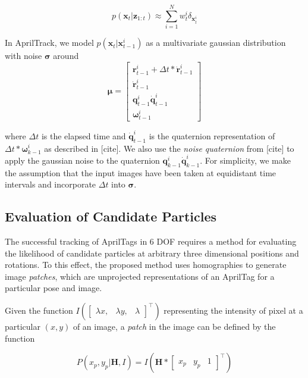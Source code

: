 \documentclass[letterpaper, 10 pt, conference]{ieeeconf}
\renewcommand{\vec}[1]{\boldsymbol{#1}}
\begin{document}
\begin{equation}
	p(\vec{x}_t|\vec{z}_{1:t}) \approx \sum_{i=1}^{N}{w^i_t\delta_{\vec{x}^i_t}}
\end{equation}

In AprilTrack, we model $p(\vec{x}_t|\vec{x}^i_{t-1})$ as a multivariate gaussian distribution with noise $\vec{\sigma}$ around 
\begin{equation}
\vec{\mu} = 
\begin{bmatrix} 
	\vec{r}^i_{t-1} + \Delta t * \dot{\vec{r}}^i_{t-1} \\
 	\dot{\vec{r}}^i_{t-1} \\
	\vec{q}^i_{t-1} \dot{\vec{q}}^i_{t-1}\\
	\vec{\omega}^i_{t-1}
\end{bmatrix}
\end{equation}

where $\Delta t$ is the elapsed time and $\dot{\vec{q}}^i_{t-1}$ is the quaternion representation of $\Delta t * \vec{\omega}^i_{k-1}$ as described in [cite]. We also use the \emph{noise quaternion} from [cite] to apply the gaussian noise to the quaternion $\vec{q}^i_{k-1} \dot{\vec{q}}^i_{k-1}$. For simplicity, we make the assumption that the input images have been taken at equidistant time intervals and incorporate $\Delta t$ into $\vec{\sigma}$.

\subsection{Evaluation of Candidate Particles}

The successful tracking of AprilTags in 6 DOF requires a method for evaluating the likelihood of candidate particles at arbitrary three dimensional positions and rotations. To this effect, the proposed method uses homographies to generate image \emph{patches}, which are unprojected representations of an AprilTag for a particular pose and image.


Given the function $I(\begin{bmatrix} \lambda x, & \lambda y, & \lambda \end{bmatrix}^\intercal )$ representing the intensity of pixel at a particular $(x,y)$ of an image, a \emph{patch} in the image can be defined by the function 

\begin{equation}
P(x_p,y_p| \vec{H}, I ) = I(\vec{H} * \begin{bmatrix} x_p & y_p & 1\end{bmatrix}^\intercal)
\end{equation}
\end{document}
